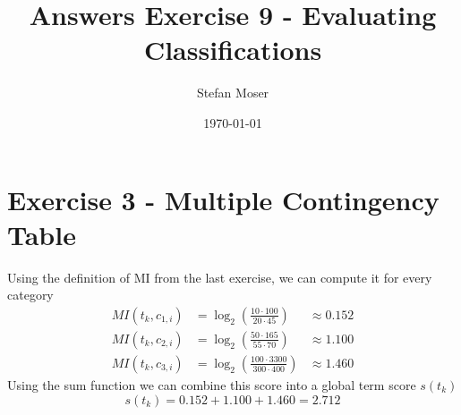 \documentclass[11pt]{article}
\title{\textbf{Answers Exercise 9 - Evaluating Classifications}}
\author{Stefan Moser}
\date{\today}
\begin{document}
\maketitle

\section*{Exercise 3 - Multiple Contingency Table}
Using the definition of MI from the last exercise, we can compute it for every category
\begin{align}
	MI(t_k, c_{1, i}) &= \log_2 \left( \frac{10 \cdot 100}{20 \cdot 45} \right) &\approx 0.152 \\
	MI(t_k, c_{2, i}) &= \log_2 \left( \frac{50 \cdot 165}{55 \cdot 70} \right) &\approx 1.100 \\
	MI(t_k, c_{3, i}) &= \log_2 \left( \frac{100 \cdot 3300}{300 \cdot 400} \right) &\approx 1.460
\end{align}
Using the sum function we can combine this score into a global term score $s(t_k)$
\begin{equation}
	s(t_k) = 0.152 + 1.100 + 1.460 = 2.712
\end{equation}
\end{document}
